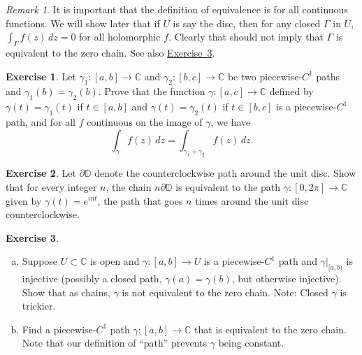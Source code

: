 \documentclass[12pt,openany]{book}
\newcommand{\C}{{\mathbb{C}}}
\newcommand{\D}{{\mathbb{D}}}
\newcommand{\myquote}[1]{``#1''}
\theoremstyle{plain}
\theoremstyle{remark}
\newtheorem{remark}[thm]{Remark}
\theoremstyle{definition}
\newenvironment{exbox}{%
    \def\FrameCommand{\vrule width 1pt \relax\hspace{10pt}}%
    \MakeFramed{\advance\hsize-\width\FrameRestore}%
}{%
    \endMakeFramed
}
\newenvironment{exparts}{%
    \leavevmode\begin{enumerate}[a),noitemsep,topsep=0pt,parsep=0pt,partopsep=0pt]
}{%
    \end{enumerate}
}
\theoremstyle{exercise}
\newtheorem{exercise}{Exercise}[section]
\theoremstyle{example}
\newcommand{\exerciseref}[1]{\hyperref[#1]{Exercise~\ref*{#1}}}
\begin{document}
\begin{remark}
It is important that the definition of equivalence is for all continuous
functions.  We will show later that if $U$ is say the disc, then for
any closed $\Gamma$ in $U$, $\int_\Gamma f(z) \, dz = 0$ for all holomorphic $f$.
Clearly that should not imply that $\Gamma$ is equivalent to the zero
chain.
See also \exerciseref{exercise:nonconstantnonzerochain}.
\end{remark}

\begin{exbox}
\begin{exercise}%
\label{exercise:pathsum}
Let $\gamma_1 \colon [a,b] \to \C$ and $\gamma_2 \colon [b,c] \to \C$
be two piecewise-$C^1$ paths and $\gamma_1(b)=\gamma_2(b)$.
Prove that the function $\gamma \colon [a,c] \to
\C$ defined by $\gamma(t) = \gamma_1(t)$ if $t \in [a,b]$ and $\gamma(t)
= \gamma_2(t)$ if $t \in [b,c]$ is a piecewise-$C^1$ path, and
for all $f$ continuous on the image of $\gamma$, we have
\begin{equation*}
\int_{\gamma} f(z)\,dz = \int_{\gamma_1 + \gamma_2} f(z) \, dz .
\end{equation*}
\end{exercise}

\begin{exercise}
Let $\partial \D$ denote the counterclockwise path around the unit disc.
Show that for every integer $n$, the chain $n \partial \D$ is equivalent to
the path $\gamma \colon [0,2\pi] \to \C$ given by $\gamma(t) = e^{int}$,
the path that goes $n$ times around the unit disc counterclockwise.
\end{exercise}

\begin{exercise} \label{exercise:nonconstantnonzerochain}
\begin{exparts}
\item
Suppose $U \subset \C$ is open and
$\gamma \colon [a,b] \to U$
is a piecewise-$C^1$
path and $\gamma|_{[a,b)}$ is injective (possibly a closed path,
$\gamma(a)=\gamma(b)$,
but otherwise injective).  Show that as chains, $\gamma$ is not equivalent to the zero chain.
Note: Closed $\gamma$ is trickier.
\item
Find a piecewise-$C^1$ path $\gamma \colon [a,b] \to \C$
that is equivalent to the zero chain.  Note that our definition of
\myquote{path}
prevents $\gamma$ being constant.
\end{exparts}
\end{exercise}
\end{exbox}
\end{document}
